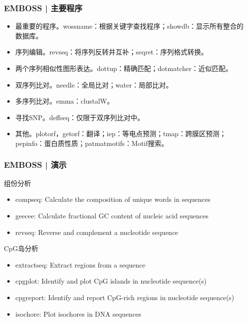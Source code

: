 \begin{frame}
  \frametitle{EMBOSS | 主要程序}
  \begin{itemize}
    \item 最重要的程序。wossname：根据关键字查找程序；showdb：显示所有整合的数据库。
    \item 序列编辑。revseq：将序列反转并互补；seqret：序列格式转换。
    \item 两个序列相似性图形表达。dottup：精确匹配；dotmatcher：近似匹配。
    \item 双序列比对。needle：全局比对；water：局部比对。
    \item 多序列比对。emma：clustalW。
    \item 寻找SNP。deffseq：仅限于双序列比对中。
    \item 其他。plotorf，getorf：翻译；iep：等电点预测；tmap：跨膜区预测；pepinfo：蛋白质性质；patmatmotifs：Motif搜索。
  \end{itemize}
\end{frame}

\begin{frame}
  \frametitle{EMBOSS | 演示}
  \begin{block}{组份分析}
  \begin{itemize}
    \item compseq: Calculate the composition of unique words in sequences
    \item geecee: Calculate fractional GC content of nucleic acid sequences
    \item revseq: Reverse and complement a nucleotide sequence
  \end{itemize}
  \end{block}
  \begin{block}{CpG岛分析}
  \begin{itemize}
    \item extractseq: Extract regions from a sequence
    \item cpgplot: Identify and plot CpG islands in nucleotide sequence(s)
    \item cpgreport: Identify and report CpG-rich regions in nucleotide sequence(s)
    \item isochore: Plot isochores in DNA sequences
  \end{itemize}
\end{block}
\end{frame}

